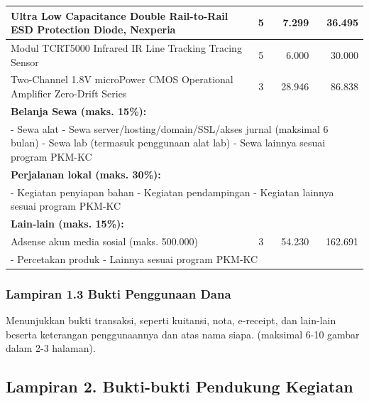 \documentclass[12pt,a4paper]{article}
\begin{document}
\begin{longtable}{|p{8cm}|c|r|r|}
Ultra Low Capacitance Double Rail-to-Rail ESD Protection Diode, Nexperia & 5 & 7.299 & 36.495 \\ \hline
Modul TCRT5000 Infrared IR Line Tracking Tracing Sensor & 5 & 6.000 & 30.000 \\ \hline
Two-Channel 1.8V microPower CMOS Operational Amplifier Zero-Drift Series & 3 & 28.946 & 86.838 \\ \hline
\multicolumn{4}{|l|}{\textbf{Belanja Sewa (maks. 15\%):}} \\ \hline
\multicolumn{4}{|p{14cm}|}{
- Sewa alat\newline
- Sewa server/hosting/domain/SSL/akses jurnal (maksimal 6 bulan)\newline
- Sewa lab (termasuk penggunaan alat lab)\newline
- Sewa lainnya sesuai program PKM-KC
} \\ \hline
\multicolumn{4}{|l|}{\textbf{Perjalanan lokal (maks. 30\%):}} \\ \hline
\multicolumn{4}{|p{14cm}|}{
- Kegiatan penyiapan bahan\newline
- Kegiatan pendampingan\newline
- Kegiatan lainnya sesuai program PKM-KC
} \\ \hline
\multicolumn{4}{|l|}{\textbf{Lain-lain (maks. 15\%):}} \\ \hline
Adsense akun media sosial (maks. 500.000) & 3 & 54.230 & 162.691 \\ \hline
\multicolumn{4}{|p{14cm}|}{
- Percetakan produk\newline
- Lainnya sesuai program PKM-KC
} \\ \hline
\end{longtable}

\subsubsection*{Lampiran 1.3 Bukti Penggunaan Dana}
Menunjukkan bukti transaksi, seperti kuitansi, nota, e-receipt, dan lain-lain beserta keterangan penggunaannya dan atas nama siapa. (maksimal 6-10 gambar dalam 2-3 halaman).

\subsection*{Lampiran 2. Bukti-bukti Pendukung Kegiatan}
\end{document}
